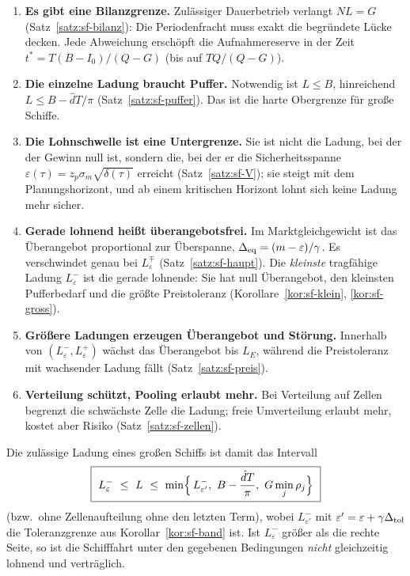 \documentclass[a4paper, 12pt, twoside, openright]{report}
\providecommand{\dhat}{\hat d}      %
\theoremstyle{definition}
\theoremstyle{definition}
\begin{document}
\begin{enumerate}
  \item \textbf{Es gibt eine Bilanzgrenze.} Zulässiger Dauerbetrieb verlangt
    $N L=G$ (Satz~\ref{satz:sf-bilanz}): Die Periodenfracht muss exakt die begründete
    Lücke decken. Jede Abweichung erschöpft die Aufnahmereserve in der Zeit
    $t^*=T(B-I_0)/(Q-G)$ (bis auf $TQ/(Q-G)$).
  \item \textbf{Die einzelne Ladung braucht Puffer.} Notwendig ist $L\le B$,
    hinreichend $L\le B-\dhat T/\pi$ (Satz~\ref{satz:sf-puffer}). Das ist die
    harte Obergrenze für große Schiffe.
  \item \textbf{Die Lohnschwelle ist eine Untergrenze.} Sie ist nicht die
    Ladung, bei der der Gewinn null ist, sondern die, bei der er die
    Sicherheitsspanne $\varepsilon(\tau)=z_p\sigma_m\sqrt{\delta(\tau)}$
    erreicht (Satz~\ref{satz:sf-V}); sie steigt mit dem Planungshorizont, und ab
    einem kritischen Horizont lohnt sich keine Ladung mehr sicher.
  \item \textbf{Gerade lohnend heißt überangebotsfrei.} Im Marktgleichgewicht ist
    das Überangebot proportional zur Überspanne, $\Delta_{\rm eq}=(m-\varepsilon)/\gamma$.
    Es verschwindet genau bei $L_\varepsilon^\mp$ (Satz~\ref{satz:sf-haupt}).
    Die \emph{kleinste} tragfähige Ladung $L_\varepsilon^-$ ist die gerade lohnende:
    Sie hat null Überangebot, den kleinsten Pufferbedarf und die größte
    Preistoleranz (Korollare~\ref{kor:sf-klein}, \ref{kor:sf-gross}).
  \item \textbf{Größere Ladungen erzeugen Überangebot und Störung.} Innerhalb von
    $(L_\varepsilon^-,L_\varepsilon^+)$ wächst das Überangebot bis $L_E$, während die
    Preistoleranz mit wachsender Ladung fällt (Satz~\ref{satz:sf-preis}).
  \item \textbf{Verteilung schützt, Pooling erlaubt mehr.} Bei Verteilung auf Zellen
    begrenzt die schwächste Zelle die Ladung; freie Umverteilung erlaubt mehr,
    kostet aber Risiko (Satz~\ref{satz:sf-zellen}).
\end{enumerate}

Die zulässige Ladung eines großen Schiffs ist damit das Intervall
\begin{equation}
  \boxed{\ L_\varepsilon^-\ \le\ L\ \le\ \min\Bigl\{\,L_{\varepsilon'}^-,\ B-\frac{\dhat T}{\pi},\ G\min_j\rho_j\Bigr\}\ }
\end{equation}
(bzw.\ ohne Zellenaufteilung ohne den letzten Term), wobei $L_{\varepsilon'}^-$ mit
$\varepsilon'=\varepsilon+\gamma\Delta_{\rm tol}$ die Toleranzgrenze aus
Korollar~\ref{kor:sf-band} ist. Ist $L_\varepsilon^-$ größer als die rechte Seite, so
ist die Schifffahrt unter den gegebenen Bedingungen \emph{nicht} gleichzeitig
lohnend und verträglich.
\end{document}
